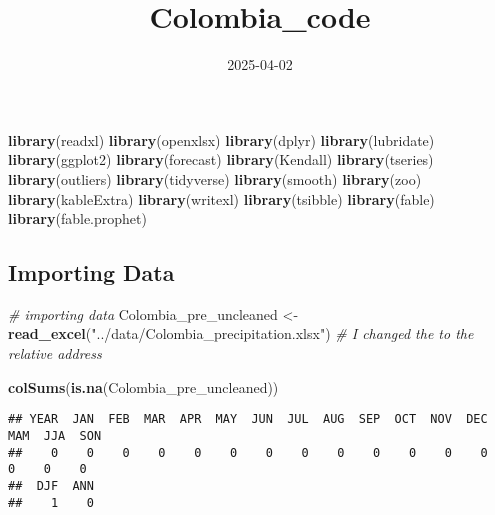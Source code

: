 \documentclass[
]{article}
\title{Colombia\_code}
\author{}
\date{\vspace{-2.5em}2025-04-02}
\newenvironment{Shaded}{\begin{snugshade}}{\end{snugshade}}
\newcommand{\AttributeTok}[1]{\textcolor[rgb]{0.13,0.29,0.53}{#1}}
\newcommand{\CommentTok}[1]{\textcolor[rgb]{0.56,0.35,0.01}{\textit{#1}}}
\newcommand{\ConstantTok}[1]{\textcolor[rgb]{0.56,0.35,0.01}{#1}}
\newcommand{\FunctionTok}[1]{\textcolor[rgb]{0.13,0.29,0.53}{\textbf{#1}}}
\newcommand{\NormalTok}[1]{#1}
\newcommand{\OtherTok}[1]{\textcolor[rgb]{0.56,0.35,0.01}{#1}}
\newcommand{\SpecialCharTok}[1]{\textcolor[rgb]{0.81,0.36,0.00}{\textbf{#1}}}
\newcommand{\StringTok}[1]{\textcolor[rgb]{0.31,0.60,0.02}{#1}}
\begin{document}
\maketitle

\begin{Shaded}
\begin{Highlighting}[]
\FunctionTok{library}\NormalTok{(readxl)}
\FunctionTok{library}\NormalTok{(openxlsx)}
\FunctionTok{library}\NormalTok{(dplyr)}
\FunctionTok{library}\NormalTok{(lubridate)}
\FunctionTok{library}\NormalTok{(ggplot2)}
\FunctionTok{library}\NormalTok{(forecast)}
\FunctionTok{library}\NormalTok{(Kendall)}
\FunctionTok{library}\NormalTok{(tseries)}
\FunctionTok{library}\NormalTok{(outliers)}
\FunctionTok{library}\NormalTok{(tidyverse)}
\FunctionTok{library}\NormalTok{(smooth)}
\FunctionTok{library}\NormalTok{(zoo)}
\FunctionTok{library}\NormalTok{(kableExtra)}
\FunctionTok{library}\NormalTok{(writexl)}
\FunctionTok{library}\NormalTok{(tsibble)}
\FunctionTok{library}\NormalTok{(fable)}
\FunctionTok{library}\NormalTok{(fable.prophet)}
\end{Highlighting}
\end{Shaded}

\subsection{Importing Data}\label{importing-data}

\begin{Shaded}
\begin{Highlighting}[]
\CommentTok{\# importing data}
\NormalTok{Colombia\_pre\_uncleaned }\OtherTok{\textless{}{-}} \FunctionTok{read\_excel}\NormalTok{(}\StringTok{"../data/Colombia\_precipitation.xlsx"}\NormalTok{)  }\CommentTok{\# I changed the to the relative address }

\FunctionTok{colSums}\NormalTok{(}\FunctionTok{is.na}\NormalTok{(Colombia\_pre\_uncleaned))}
\end{Highlighting}
\end{Shaded}

\begin{verbatim}
## YEAR  JAN  FEB  MAR  APR  MAY  JUN  JUL  AUG  SEP  OCT  NOV  DEC  MAM  JJA  SON 
##    0    0    0    0    0    0    0    0    0    0    0    0    0    0    0    0 
##  DJF  ANN 
##    1    0
\end{verbatim}

\begin{Shaded}
\end{Shaded}
\end{document}
